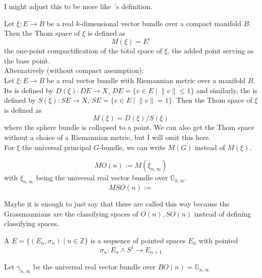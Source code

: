 \documentclass[a4paper,11pt]{article}
\begin{document}
I might adjust this to be more like\ \cite{thom}'s definition.
\begin{definition}
    Let \(\xi:E\to B\) be a real \(k\)-dimensional vector bundle over a compact manifold \(B\).
    Then the Thom space of \(\xi\) is defined as\[M(\xi)=E^c\] the one-point compactification of the total space of \(\xi\), the added point serving as the base point.\\
    Alternatively (without compact assumption):\\
    Let \(\xi:E\to B\) be a real vector bundle with Riemannian metric over a manifold \(B\). Its  is defined by \(D(\xi):DE\to X\), \(DE=\{v\in E\mid \lVert v\rVert \leq 1\}\) and similarly, the  is defined by \(S(\xi):SE\to X\), \(SE=\{v\in E\mid \lVert v\rVert = 1\}\). Then the Thom space of \(\xi\) is defined as
    \[M(\xi)=D(\xi)\big/S(\xi)\]
    where the sphere bundle is collapsed to a point. We can also get the Thom space without a choice of a Riemannian metric, but I will omit this here.\\
    For \(\xi\) the universal principal \(G\)-bundle, we can write \(M(G)\) instead of \(M(\xi)\).
\end{definition}

\begin{definition}
    \[MO(n):=M(\xi_{n,\infty})\] with \(\xi_{n,\infty}\) being the universal real vector bundle over \(\mathbb{G}_{k,\infty}\).
    \[MSO(n):=  \]
\end{definition}
Maybe it is enough to just say that these are called this way because the Grassmannians are the classifying spaces of \(O(n), SO(n)\) instead of defining classifying spaces.

\begin{definition}
    A  \(\underline E = \{(E_n,\sigma_n)\mid n\in\mathbb{Z}\}\) is a sequence of pointed spaces \(E_n\) with pointed \[\sigma_n:E_n\wedge{S^1}\to E_{n+1}\]
\end{definition}

\begin{example}
    
\end{example}

\begin{example}
    Let \(\gamma_{n,\infty}\) be the universal real vector bundle over \(BO(n)=\mathbb{G}_{n,\infty}\)
\end{example}
\end{document}
